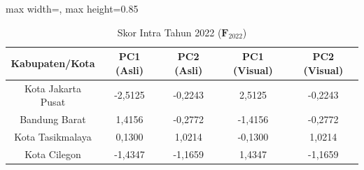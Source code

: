 \begin{table}[H]
\centering
\caption{Skor Intra Tahun 2022 ($\mathbf{F}_{2022}$)} \label{tab:sample1skor_intra_2022}
\begin{adjustbox}{max width=\textwidth, max height=0.85\textheight}
\begin{tabular}{|c|c|c|c|c|}
\hline
\textbf{Kabupaten/Kota} & \textbf{PC1 (Asli)} & \textbf{PC2 (Asli)} & \textbf{PC1 (Visual)} & \textbf{PC2 (Visual)} \\
\hline
Kota Jakarta Pusat & -2,5125 & -0,2243 & 2,5125 & -0,2243 \\
Bandung Barat & 1,4156 & -0,2772 & -1,4156 & -0,2772 \\
Kota Tasikmalaya & 0,1300 & 1,0214 & -0,1300 & 1,0214 \\
Kota Cilegon & -1,4347 & -1,1659 & 1,4347 & -1,1659 \\
\hline
\end{tabular}
\end{adjustbox}
\end{table}